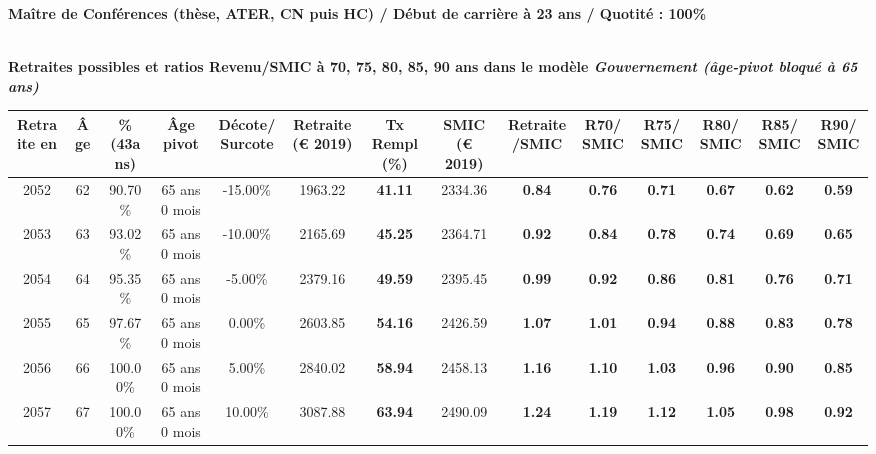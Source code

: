 {\bf \noindent Maître de Conférences (thèse, ATER, CN puis HC) / Début de carrière à 23 ans / Quotité : 100\%}  ~ 

 ~\\{\bf \noindent Retraites possibles et ratios Revenu/SMIC à 70, 75, 80, 85, 90 ans dans le modèle \emph{Gouvernement (âge-pivot bloqué à 65 ans)}}  
 
\begin{adjustbox}{max width=\textwidth} 
\begin{tabular}[htb]{|c|c||c|c|c||c|c||c|c||c|c|c|c|c|} 
\hline 
 Retraite en &  Âge &  \%(43ans) &  Âge pivot &  Décote/Surcote &  Retraite (\euro{} 2019) &  Tx Rempl(\%) &  SMIC (\euro{} 2019) &  Retraite/SMIC &  R70/SMIC &  R75/SMIC &  R80/SMIC &  R85/SMIC &  R90/SMIC \\ 
\hline \hline 
 2052 &  62 &  90.70\% &  65 ans 0 mois &  -15.00\% &  1963.22 &  {\bf 41.11} &  2334.36 &  {\bf {\color{red} 0.84}} &  {\bf {\color{red} 0.76}} &  {\bf {\color{red} 0.71}} &  {\bf {\color{red} 0.67}} &  {\bf {\color{red} 0.62}} &  {\bf {\color{red} 0.59}} \\ 
\hline 
 2053 &  63 &  93.02\% &  65 ans 0 mois &  -10.00\% &  2165.69 &  {\bf 45.25} &  2364.71 &  {\bf {\color{red} 0.92}} &  {\bf {\color{red} 0.84}} &  {\bf {\color{red} 0.78}} &  {\bf {\color{red} 0.74}} &  {\bf {\color{red} 0.69}} &  {\bf {\color{red} 0.65}} \\ 
\hline 
 2054 &  64 &  95.35\% &  65 ans 0 mois &  -5.00\% &  2379.16 &  {\bf 49.59} &  2395.45 &  {\bf {\color{red} 0.99}} &  {\bf {\color{red} 0.92}} &  {\bf {\color{red} 0.86}} &  {\bf {\color{red} 0.81}} &  {\bf {\color{red} 0.76}} &  {\bf {\color{red} 0.71}} \\ 
\hline 
 2055 &  65 &  97.67\% &  65 ans 0 mois &  0.00\% &  2603.85 &  {\bf 54.16} &  2426.59 &  {\bf 1.07} &  {\bf 1.01} &  {\bf {\color{red} 0.94}} &  {\bf {\color{red} 0.88}} &  {\bf {\color{red} 0.83}} &  {\bf {\color{red} 0.78}} \\ 
\hline 
 2056 &  66 &  100.00\% &  65 ans 0 mois &  5.00\% &  2840.02 &  {\bf 58.94} &  2458.13 &  {\bf 1.16} &  {\bf 1.10} &  {\bf 1.03} &  {\bf {\color{red} 0.96}} &  {\bf {\color{red} 0.90}} &  {\bf {\color{red} 0.85}} \\ 
\hline 
 2057 &  67 &  100.00\% &  65 ans 0 mois &  10.00\% &  3087.88 &  {\bf 63.94} &  2490.09 &  {\bf 1.24} &  {\bf 1.19} &  {\bf 1.12} &  {\bf 1.05} &  {\bf {\color{red} 0.98}} &  {\bf {\color{red} 0.92}} \\ 
\hline 
\hline 
\end{tabular} 
\end{adjustbox} 
 
